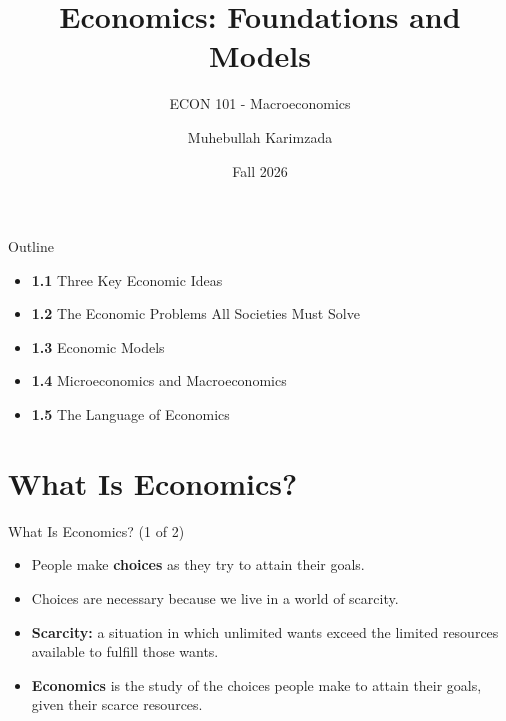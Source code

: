 \documentclass[aspectratio=169]{beamer}
\title{\textbf{Economics: Foundations and Models  \vspace{.5cm}\\  }}
\subtitle{ {\large ECON 101 - Macroeconomics}}
\author{Muhebullah Karimzada}
\date{Fall 2026}
\begin{document}
\begin{frame}[plain]
  \titlepage
\end{frame}
%
\begin{frame}{Outline}
\transfade
\begin{itemize}[<+->]
  \item \textbf{1.1} Three Key Economic Ideas
  \item \textbf{1.2} The Economic Problems All Societies Must Solve
  \item \textbf{1.3} Economic Models
  \item \textbf{1.4} Microeconomics and Macroeconomics
  \item \textbf{1.5} The Language of Economics
\end{itemize}
\end{frame}

\section{What Is Economics?}

\begin{frame}{What Is Economics? (1 of 2)}
\transfade
\begin{itemize}[<+->]
  \item People make \textbf{choices} as they try to attain their goals.
  \item Choices are necessary because we live in a world of \alert{scarcity}.
  \item \textbf{Scarcity:} a situation in which unlimited wants exceed the limited resources available to fulfill those wants.
  \item \textbf{Economics} is the study of the choices people make to attain their goals, given their scarce resources.
\end{itemize}
\end{frame}
\end{document}

